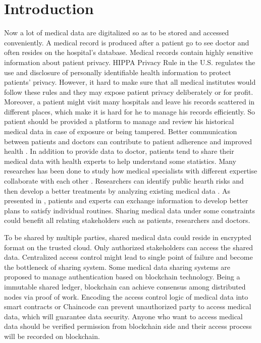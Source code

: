 \documentclass[conference]{IEEEtran}
\begin{document}
\section{Introduction}

Now a lot of medical data are digitalized so as to be stored and accessed conveniently. A medical record is produced after a patient go to see doctor and often resides on the hospital's database. Medical records contain highly sensitive information about patient privacy. HIPPA Privacy Rule  \cite{centers2004hipaa} in the U.S. regulates the use and disclosure of personally identifiable health information to protect patients' privacy. However, it hard to make sure that all medical institutes would follow these rules and they may expose patient privacy deliberately or for profit. Moreover, a patient might visit many hospitals and leave his records scattered \cite{zhang2016secure} in different places, which make it is hard for he to manage his records efficiently. So patient should be provided a platform to manage and review his historical medical data in case of exposure or being tampered. Better communication between patients and doctors can contribute to patient adherence \cite{zolnierek2009physician} and  improved health \cite{street2009does}. In addition to provide data to doctor, patients tend to share their medical data with health experts to help understand some statistics. Many researches has been done to study how medical specialists with different expertise collaborate with each other \cite{fitzpatrick2013review}.  Researchers can identify public hearth risks and then develop a better treatments by analyzing existing medical data \cite{office2015report}. As presented in \cite{chung2018using},  patients and experts can exchange information to develop better plans to satisfy individual routines. Sharing medical data under some constraints could benefit all relating stakeholders such as patients, researchers and doctors. 

To be shared by multiple parties, shared medical data could reside in encrypted format on the trusted cloud. Only authorized stakeholders can access the shared data. Centralized access control might lead to single point of failure and become the bottleneck of sharing system. Some medical data sharing systems \cite{azaria2016medrec,fan2018medblock,xia2017bbds} are proposed to manage authentication based on blockchain\cite{nakamoto2008bitcoin} technology. Being a immutable shared ledger, blockchain can achieve consensus among distributed nodes via proof of work. Encoding the access control logic of medical data into smart contracts\cite{azaria2016medrec} or Chaincode \cite{dubovitskaya2017secure} can prevent unauthorized party to access medical data, which will guarantee data security. Anyone who want to access medical data should be verified permission from blockchain side and their access process will be recorded on blockchain.
\end{document}
